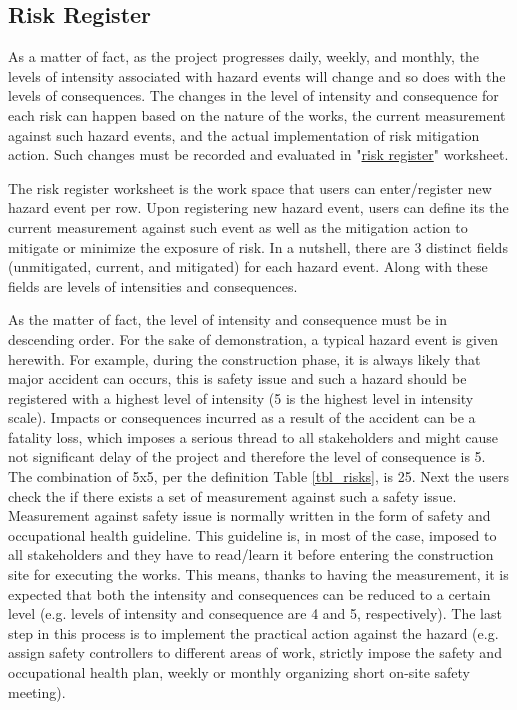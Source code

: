 \documentclass[10pt,halfline,a4paper]{ouparticle}
\begin{document}
\subsection{Risk Register} \label{subriskregister}
As a matter of fact, as the project progresses daily, weekly, and monthly, the levels of intensity associated with hazard events will change and so does with the levels of consequences. The changes in the level of intensity and consequence for each risk can happen based on the nature of the works, the current measurement against such hazard events, and the actual implementation of risk mitigation action. Such changes must be recorded and evaluated in "\underline{risk register}" worksheet. 

The risk register worksheet is the work space that users can enter/register new hazard event per row. Upon registering new hazard event, users can define its the current measurement against such event as well as the mitigation action to mitigate or minimize the exposure of risk. In a nutshell, there are 3 distinct fields (unmitigated, current, and mitigated) for each hazard event. Along with these fields are levels of intensities and consequences. 

As the matter of fact, the level of intensity and consequence must be in descending order. For the sake of demonstration, a typical hazard event is given herewith. For example, during the construction phase, it is always likely that major accident can occurs, this is safety issue and such a hazard should be registered with a highest level of intensity (5 is the highest level in intensity scale). Impacts or consequences incurred as a result of the accident can be a fatality loss, which imposes a serious thread to all stakeholders and might cause not significant delay of the project and therefore the level of consequence is 5. The combination of 5x5, per the definition Table \ref{tbl_risks}, is 25. Next the users check the if there exists a set of measurement against such a safety issue. Measurement against safety issue is normally written in the form of safety and occupational health guideline. This guideline is, in most of the case, imposed to all stakeholders and they have to read/learn it before entering the construction site for executing the works. This means, thanks to having the measurement, it is expected that both the intensity and consequences can be reduced to a certain level (e.g. levels of intensity and consequence are 4 and 5, respectively). The last step in this process is to implement the practical action against the hazard (e.g. assign safety controllers to different areas of work, strictly impose the safety and occupational health plan, weekly or monthly organizing short on-site safety meeting). 
\end{document}
